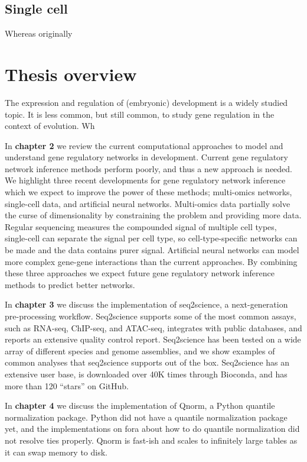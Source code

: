 \subsection{Single cell}

Whereas originally 

\section{Thesis overview}

The expression and regulation of (embryonic) development is a widely studied topic. It is less common, but still common, to study gene regulation in the context of evolution. Wh

In \textbf{chapter 2} we review the current computational approaches to model and understand gene regulatory networks in development. Current gene regulatory network inference methods perform poorly, and thus a new approach is needed. We highlight three recent developments for gene regulatory network inference which we expect to improve the power of these methods; multi-omics networks, single-cell data, and artificial neural networks. Multi-omics data partially solve the curse of dimensionality by constraining the problem and providing more data. Regular sequencing measures the compounded signal of multiple cell types, single-cell can separate the signal per cell type, so cell-type-specific networks can be made and the data contains purer signal. Artificial neural networks can model more complex gene-gene interactions than the current approaches. By combining these three approaches we expect future gene regulatory network inference methods to predict better networks.

In \textbf{chapter 3} we discuss the implementation of seq2science, a next-generation pre-processing workflow. Seq2science supports some of the most common assays, such as RNA-seq, ChIP-seq, and ATAC-seq, integrates with public databases, and reports an extensive quality control report. Seq2science has been tested on a wide array of different species and genome assemblies, and we show examples of common analyses that seq2science supports out of the box. Seq2science has an extensive user base\cite{Bright_2021,Xu_2020,Wester2021,SantosBarriopedro2021,Heuts2023,Tholen2023,Harlaar2022,LunaVelez2023,Neikes2023,Vierboom2021,Smits2020,Smits2022,Heuts2022,Rother2023}, is downloaded over 40K times through Bioconda, and has more than 120 ``stars'' on GitHub.

In \textbf{chapter 4} we discuss the implementation of Qnorm,  a Python quantile normalization package. Python did not have a quantile normalization package yet, and the implementations on fora about how to do quantile normalization did not resolve ties properly. Qnorm is fast-ish and scales to infinitely large tables as it can swap memory to disk.

